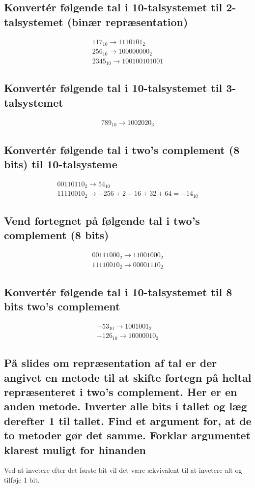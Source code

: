 \documentclass[12pt, a4paper]{article}
\begin{document}
			\subsection{Konvertér følgende tal i 10-talsystemet til 2-talsystemet (binær repræsentation)}
				\begin{align*}
					117_{10}\rightarrow 1110101_2\\
					256_{10}\rightarrow 100000000_2\\
					2345_{10}\rightarrow 100100101001 
				\end{align*}
			\subsection{Konvertér følgende tal i 10-talsystemet til 3-talsystemet}
				\begin{align*}
					789_{10}\rightarrow 1002020_3
				\end{align*}
			\subsection{Konvertér følgende tal i two’s complement (8 bits) til 10-talsysteme}
				\begin{align*}
					00110110_2 \rightarrow 54_{10}\\
					11110010_2 \rightarrow -256+2+16+32+64=-14_{10}
				\end{align*}
			\subsection{Vend fortegnet på følgende tal i two’s complement (8 bits)}
				\begin{align*}
					00111000_2\rightarrow 11001000_2\\
					11110010_2\rightarrow 00001110_2
				\end{align*}
			\subsection{Konvertér følgende tal i 10-talsystemet til 8 bits two’s complement}
				\begin{align*}
					-53_{10}\rightarrow 1001001_2\\
					-126_{10}\rightarrow 10000010_2
				\end{align*}
			\subsection{På slides om repræsentation af tal er der angivet en metode til at skifte fortegn på heltal repræsenteret i two's complement. Her er en anden metode. Inverter alle bits i tallet og læg derefter 1 til tallet. Find et argument for, at de to metoder gør det samme. Forklar argumentet klarest muligt for hinanden}
				Ved at invetere efter det første bit vil det være ækvivalent til at invetere alt og tilføje 1 bit.
\end{document}
